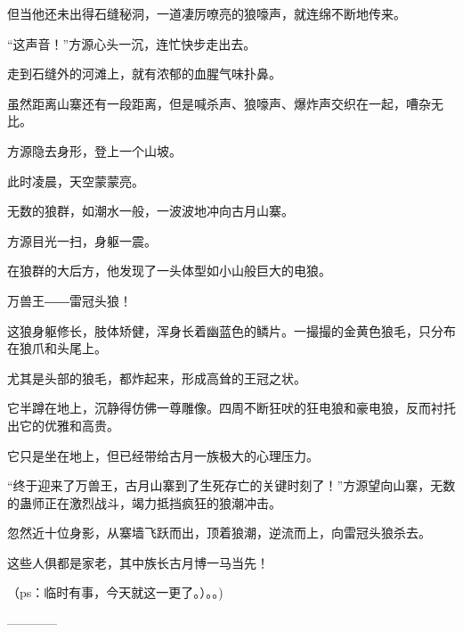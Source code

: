 \begin{this_body}
但当他还未出得石缝秘洞，一道凄厉嘹亮的狼嚎声，就连绵不断地传来。

“这声音！”方源心头一沉，连忙快步走出去。

走到石缝外的河滩上，就有浓郁的血腥气味扑鼻。

虽然距离山寨还有一段距离，但是喊杀声、狼嚎声、爆炸声交织在一起，嘈杂无比。

方源隐去身形，登上一个山坡。

此时凌晨，天空蒙蒙亮。

无数的狼群，如潮水一般，一波波地冲向古月山寨。

方源目光一扫，身躯一震。

在狼群的大后方，他发现了一头体型如小山般巨大的电狼。

万兽王――雷冠头狼！

这狼身躯修长，肢体矫健，浑身长着幽蓝色的鳞片。一撮撮的金黄色狼毛，只分布在狼爪和头尾上。

尤其是头部的狼毛，都炸起来，形成高耸的王冠之状。

它半蹲在地上，沉静得仿佛一尊雕像。四周不断狂吠的狂电狼和豪电狼，反而衬托出它的优雅和高贵。

它只是坐在地上，但已经带给古月一族极大的心理压力。

“终于迎来了万兽王，古月山寨到了生死存亡的关键时刻了！”方源望向山寨，无数的蛊师正在激烈战斗，竭力抵挡疯狂的狼潮冲击。

忽然近十位身影，从寨墙飞跃而出，顶着狼潮，逆流而上，向雷冠头狼杀去。

这些人俱都是家老，其中族长古月博一马当先！

（ps：临时有事，今天就这一更了。）。。)

------------

\end{this_body}


